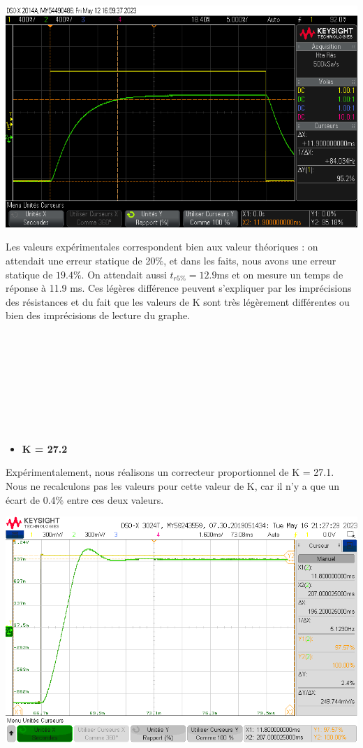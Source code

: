 \documentclass[12pt]{article}
\begin{document}
    \begin{center}
    \includegraphics[width = 18 cm]{TP3/Syst_1/P/tr5prct_syst1_K2_2.png}
\end{center}
Les valeurs expérimentales correspondent bien aux valeur théoriques : on attendait une erreur statique de 20$\%$, et dans les faits, nous avons une erreur statique de $19.4\%$. On attendait aussi $t_{r5\%} = 12.9$ms et on mesure un temps de réponse à 11.9 ms. Ces légères différence peuvent s'expliquer par les imprécisions des résistances et du fait que les valeurs de K sont très légèrement différentes ou bien des imprécisions de lecture du graphe.
\\\\\\\\\\\\\\\\\\
\begin{itemize}
\item \bf \large K = 27.2
\end{itemize}
Expérimentalement, nous réalisons un correcteur proportionnel de K = 27.1. Nous ne recalculons pas les valeurs pour cette valeur de K, car il n'y a que un écart de 0.4$\%$ entre ces deux valeurs.
\begin{center}
    \includegraphics[width = 16 cm]{TP3/Syst_1/P/estat-syst1-k27,2.png}
\end{center}
\end{document}
